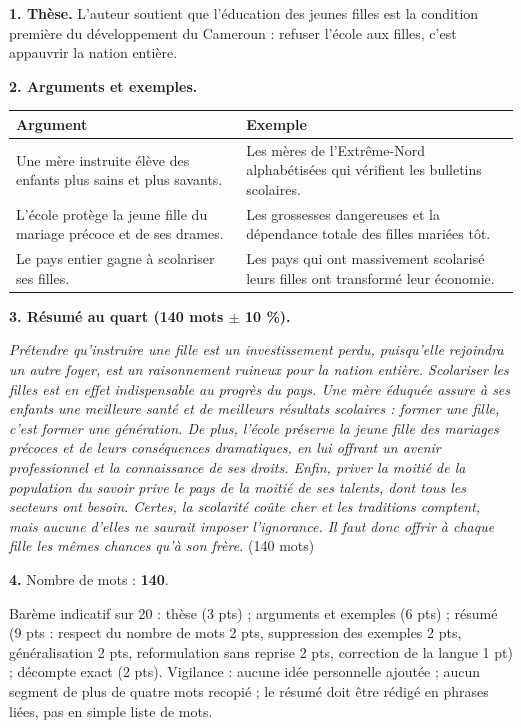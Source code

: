 \documentclass[11pt]{article}
\begin{document}
\begin{corrige}
\textbf{1. Thèse.} L'auteur soutient que l'éducation des jeunes filles est la condition première du développement du Cameroun : refuser l'école aux filles, c'est appauvrir la nation entière.

\textbf{2. Arguments et exemples.}
\begin{center}
\begin{tabularx}{\linewidth}{|X|X|}
\hline
\rowcolor{popblueL} \textbf{Argument} & \textbf{Exemple} \\
\hline
Une mère instruite élève des enfants plus sains et plus savants. & Les mères de l'Extrême-Nord alphabétisées qui vérifient les bulletins scolaires. \\
\hline
L'école protège la jeune fille du mariage précoce et de ses drames. & Les grossesses dangereuses et la dépendance totale des filles mariées tôt. \\
\hline
Le pays entier gagne à scolariser ses filles. & Les pays qui ont massivement scolarisé leurs filles ont transformé leur économie. \\
\hline
\end{tabularx}
\end{center}

\textbf{3. Résumé au quart (140 mots $\pm$ 10 \%).}

\emph{Prétendre qu'instruire une fille est un investissement perdu, puisqu'elle rejoindra un autre foyer, est un raisonnement ruineux pour la nation entière. Scolariser les filles est en effet indispensable au progrès du pays. Une mère éduquée assure à ses enfants une meilleure santé et de meilleurs résultats scolaires : former une fille, c'est former une génération. De plus, l'école préserve la jeune fille des mariages précoces et de leurs conséquences dramatiques, en lui offrant un avenir professionnel et la connaissance de ses droits. Enfin, priver la moitié de la population du savoir prive le pays de la moitié de ses talents, dont tous les secteurs ont besoin. Certes, la scolarité coûte cher et les traditions comptent, mais aucune d'elles ne saurait imposer l'ignorance. Il faut donc offrir à chaque fille les mêmes chances qu'à son frère.} (140 mots)

\textbf{4.} Nombre de mots : \textbf{140}.

\begin{attention}
Barème indicatif sur 20 : thèse (3 pts) ; arguments et exemples (6 pts) ; résumé (9 pts : respect du nombre de mots 2 pts, suppression des exemples 2 pts, généralisation 2 pts, reformulation sans reprise 2 pts, correction de la langue 1 pt) ; décompte exact (2 pts). Vigilance : aucune idée personnelle ajoutée ; aucun segment de plus de quatre mots recopié ; le résumé doit être rédigé en phrases liées, pas en simple liste de mots.
\end{attention}
\end{corrige}
\end{document}
